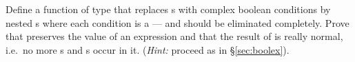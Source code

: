 \begin{isabellebody}
\begin{isamarkuptext}
\begin{exercise}
  Define a function  of type  that
  replaces s with complex boolean conditions by nested
  s where each condition is a  ---  and
   should be eliminated completely. Prove that 
  preserves the value of an expression and that the result of 
  is really normal, i.e.\ no more s and s occur in
  it.  ({\em Hint:} proceed as in \S\ref{sec:boolex}).
\end{exercise}%
\end{isamarkuptext}%
\end{isabellebody}%
